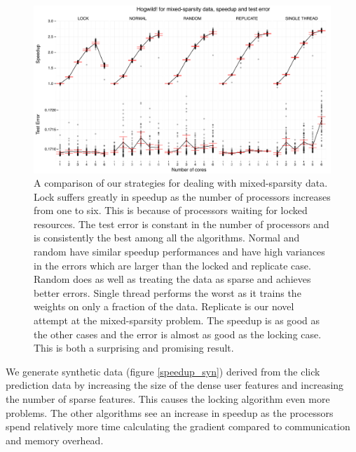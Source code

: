 \documentclass{article} %
\begin{document}
\begin{figure}[H]
\centering
\includegraphics[width=\textwidth]{../../speedup_errors_complete.pdf}
\caption{A comparison of our strategies for dealing with mixed-sparsity data. Lock suffers greatly in speedup as the number of processors increases from one to six. This is because of processors waiting for locked resources. The test error is constant in the number of processors and is consistently the best among all the algorithms. Normal and random have similar speedup performances and have high variances in the errors which are larger than the locked and replicate case. Random does as well as treating the data as sparse and achieves better errors. Single thread performs the worst as it trains the weights on only a fraction of the data. Replicate is our novel attempt at the mixed-sparsity problem. The speedup is as good as the other cases and the error is almost as good as the locking case. This is both a surprising and promising result.}
\label{speedup_all}
\end{figure}

We generate synthetic data (figure \ref{speedup_syn}) derived from the click prediction data by increasing the size of the dense user features and increasing the number of sparse features. This causes the locking algorithm even more problems. The other algorithms see an increase in speedup as the processors spend relatively more time calculating the gradient compared to communication and memory overhead.
\end{document}
